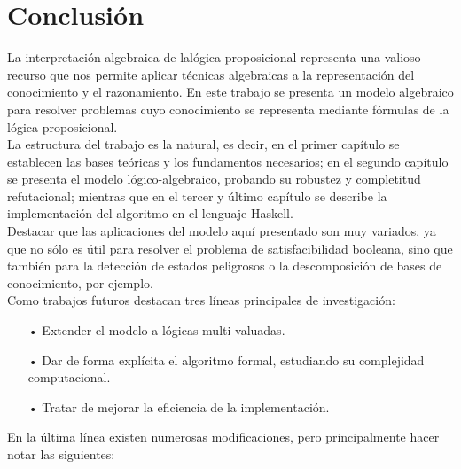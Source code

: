 \chapter*{Conclusión}

La interpretación algebraica de lalógica proposicional representa una valioso recurso que nos permite aplicar técnicas algebraicas a la representación del conocimiento y el razonamiento. En este trabajo se presenta un modelo algebraico para resolver problemas cuyo conocimiento se representa mediante fórmulas de la lógica proposicional.\\

La estructura del trabajo es la natural, es decir, en el primer capítulo se establecen las bases teóricas y los fundamentos necesarios; en el segundo capítulo se presenta el modelo lógico-algebraico, probando su robustez y completitud refutacional; mientras que en el tercer y último capítulo se describe la implementación del algoritmo en el lenguaje Haskell.\\

Destacar que las aplicaciones del modelo aquí presentado son muy variados, ya que no sólo es útil para resolver el problema de satisfacibilidad booleana, sino que también para la detección de estados peligrosos o la descomposición de bases de conocimiento, por ejemplo.\\

Como trabajos futuros destacan tres líneas principales de investigación:

\begin{itemize}
\item[•] Extender el modelo a lógicas multi-valuadas.
\item[•] Dar de forma explícita el algoritmo formal, estudiando su complejidad computacional.
\item[•] Tratar de mejorar la eficiencia de la implementación.
\end{itemize}

En la última línea existen numerosas modificaciones, pero principalmente hacer notar las siguientes:

